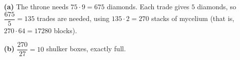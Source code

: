 \textbf{(a)} The throne needs $75\cdot9=675$ diamonds. Each trade gives $5$ diamonds, so $\dfrac{675}{5}=135$ trades are needed, using $135\cdot2=\boxed{270}$ stacks of mycelium (that is, $270\cdot64=17280$ blocks).

\textbf{(b)} $\dfrac{270}{27}=\boxed{10}$ shulker boxes, exactly full.
